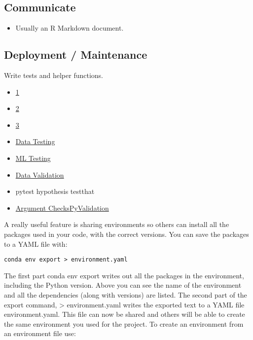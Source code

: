 \documentclass[]{book}
\providecommand{\tightlist}{%
  \setlength{\itemsep}{0pt}\setlength{\parskip}{0pt}}
\theoremstyle{definition}
\theoremstyle{definition}
\theoremstyle{definition}
\theoremstyle{remark}
\begin{document}
\subsection{Communicate}\label{communicate}

\begin{itemize}
\tightlist
\item
  Usually an R Markdown document.
\end{itemize}

\subsection{Deployment / Maintenance}\label{deployment-maintenance}

Write tests and helper functions.

\begin{itemize}
\tightlist
\item
  \href{http://engineering.pivotal.io/post/test-driven-development-for-data-science/}{1}
\item
  \href{http://www.tdda.info/}{2}
\item
  \href{http://stochasticsolutions.com/}{3}
\item
  \href{https://github.com/ericmjl/data-testing-tutorial}{Data Testing}
\item
  \href{https://medium.com/@keeper6928/how-to-unit-test-machine-learning-code-57cf6fd81765}{ML
  Testing}
\item
  \href{https://github.com/data-cleaning/validate}{Data Validation}
\item
  pytest \textbar{} hypothesis \textbar{} testthat
\item
  \href{https://rdrr.io/cran/checkmate/}{Argument
  Checks}\href{https://github.com/shawnbrown/datatest}{PyValidation}
\end{itemize}

A really useful feature is sharing environments so others can install
all the packages used in your code, with the correct versions. You can
save the packages to a YAML file with:

\texttt{conda\ env\ export\ \textgreater{}\ environment.yaml}

The first part conda env export writes out all the packages in the
environment, including the Python version. Above you can see the name of
the environment and all the dependencies (along with versions) are
listed. The second part of the export command, \textgreater{}
environment.yaml writes the exported text to a YAML file
environment.yaml. This file can now be shared and others will be able to
create the same environment you used for the project. To create an
environment from an environment file use:
\end{document}
